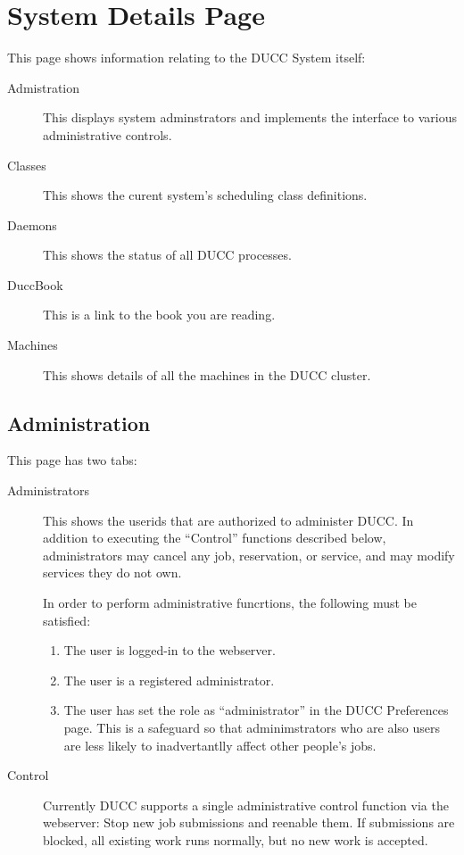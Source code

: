 
\section{System  Details Page}
\label{sec:system-details}

This page shows information relating to the DUCC System itself:
\begin{description}
  \item[Admistration]This displays system adminstrators and implements
    the interface to various administrative controls.
  \item[Classes] This shows the curent system's scheduling class definitions.
  \item[Daemons] This shows the status of all DUCC processes.
  \item[DuccBook] This is a link to the book you are reading.
  \item[Machines] This shows details of all the machines in the DUCC cluster.
\end{description}

\subsection{Administration}

   This page has two tabs:
   \begin{description}   
     \item[Administrators] This shows the userids that are authorized to administer
       DUCC.  In addition to executing the ``Control'' functions described below,
       administrators may cancel any job, reservation, or service, and may modify
       services they do not own.  

       In order to perform administrative funcrtions, the following must be satisfied:
       \begin{enumerate}
         \item The user is logged-in to the webserver.
         \item The user is a registered administrator.
         \item The user has set the role as ``administrator'' in the DUCC Preferences
           page.  This is a safeguard so that adminimstrators who are also users
           are less likely to inadvertantlly affect other people's jobs.
       \end{enumerate}
     \item[Control] Currently DUCC supports a single administrative control function
       via the webserver: Stop new job submissions and reenable them.  If submissions
       are blocked, all existing work runs normally, but no new work is accepted.
     \end{description}


